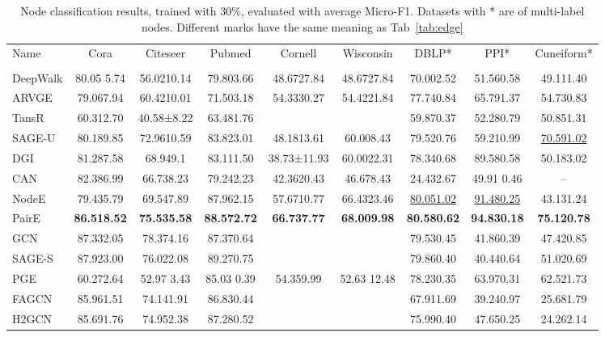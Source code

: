 \documentclass[10pt,journal,compsoc]{IEEEtran}
\begin{document}
  \begin{table*}[!htb]
  \begin{center}
  \caption{Node classification results, trained with 30\%, evaluated with average Micro-F1. Datasets with * are of multi-label nodes. Different marks have the same meaning as Tab~\ref{tab:edge}}
  \label{tab:node}
\renewcommand\arraystretch{1.1}
    \begin{tabular}{p{4.5em}|c|c|c|c|c|c|c|c}
    \hline
    Name&Cora&Citeseer&Pubmed&Cornell&Wisconsin &DBLP*&PPI*&Cuneiform* \\
     & & & & & & & & \\
\hline
    DeepWalk &80.05  5.74&56.0210.14 & 79.803.66 & 48.6727.84 & 48.6727.84 & 70.002.52 & 51.560.58 &49.111.40 \\
    ARVGE& 79.067.94 & 60.4210.01 & 71.503.18 & 54.3330.27 & 54.4221.84 & 77.740.84 & 65.791.37 & 54.730.83 \\
    TansR&60.312.70 &40.58±8.22 &63.481.76  &  & & 59.870.37  & 52.280.79 & 50.851.31 \\
    SAGE-U&80.189.85 &72.9610.59 &83.823.01 & 48.1813.61 & 60.008.43 & 79.520.76 & 59.210.99 & \underline{70.591.02} \\
    DGI&81.287.58 &68.949.1 & 83.111.50 & 38.73±11.93 & 60.0022.31 & 78.340.68 & 89.580.58 & 50.183.02 \\
    
    CAN&82.386.99 &66.738.23 &79.242.23 &42.3620.43 & 46.678.43 & 24.432.67 & 49.91 0.46 & --\\
    NodeE&79.435.79 &69.547.89 & 87.962.15 & 57.6710.77 & 66.4323.46 & \underline{80.051.02} & \underline{91.480.25} & 43.131.24 \\
    PairE&\textbf{86.518.52} &\textbf{75.535.58} &\textbf{88.572.72} & \textbf{66.737.77} & \textbf{68.00}\textbf{9.98} & \colorbox{mygray}{\textbf{80.58}\textbf{0.62}} &\colorbox{mygray}{\textbf{94.83}\textbf{0.18}} & \colorbox{mygray}{\textbf{75.12}\textbf{0.78}} \\
    \hline
    GCN& 87.332.05 & \colorbox{mygray}{78.374.16} & 87.370.64 & &  & 79.530.45 & 41.860.39 & 47.420.85 \\
    SAGE-S& \colorbox{mygray}{87.923.00} & 76.022.08	& \colorbox{mygray}{89.270.75}	& \colorbox{mygray}{} &  & 79.860.40 & 40.440.64	& 51.020.69\\
    
    PGE&60.272.64 & 52.97 3.43 & 85.03 0.39 & 54.359.99 & 52.63 12.48 &78.230.35 & 63.970.31 & 62.521.73 \\
    FAGCN& 85.961.51	&74.141.91	& 86.830.44 & &  & 67.911.69	&39.240.97	&25.681.79\\
    H2GCN& 85.691.76 & 74.952.38 & 87.280.52 &  & \colorbox{mygray}{} & 75.990.40 &47.650.25 &24.262.14\\
    \hline
    \end{tabular}
    \end{center}
\end{table*}
  
\end{document}
